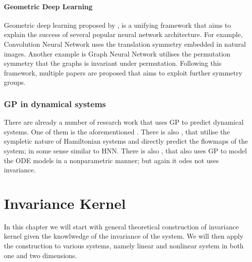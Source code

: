 \documentclass{statsmsc}
\begin{document}
\subsubsection{Geometric Deep Learning}
Geometric deep learning proposed by \cite{Bronstein2017}, is a unifying framework that aims to explain the success of several popular neural network architecture. 
For example, Convolution Neural Network uses the translation symmetry embedded in natural images. 
Another example is Graph Neural Network utilises the permutation symmetry that the graphs is invariant under permutation.
Following this framework, multiple papers are proposed that aims to exploit further symmetry groups.

\subsection{GP in dynamical systems}
There are already a number of research work that uses GP to predict dynamical systems.
One of them is the aforementioned \cite{Raissi2018}.
There is also \cite{Rath2020}, that utilise the sympletic nature of Hamiltonian systems and directly predict the flowmaps of the system; in some sense similar to HNN.
There is also \cite{Heinonen2018}, that also uses GP to model the ODE models in a nonparametric manner; but again it odes not uses invariance. 



\chapter{Invariance Kernel}
In this chapter we will start with general theoretical construction of invariance kernel given the knowlwedge of the invariance of the system.
We will then apply the construction to various systems, namely linear and nonlinear system in both one and two dimensions.
\end{document}

